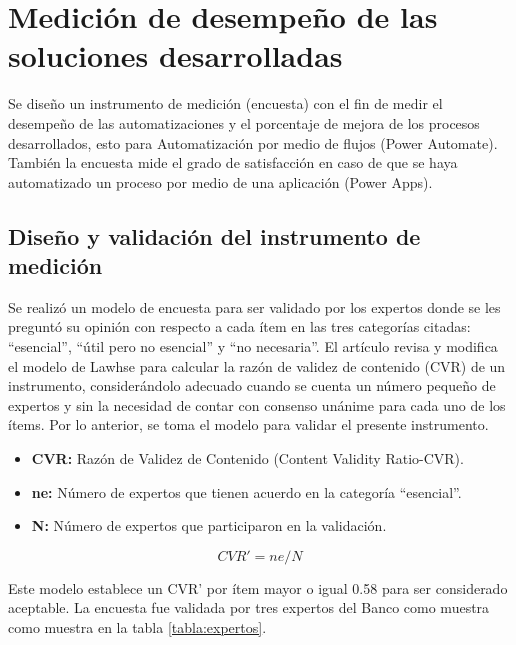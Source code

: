 \chapter{Medición de desempeño de las soluciones desarrolladas}
Se diseño un instrumento de medición (encuesta) con el fin de medir el desempeño de las automatizaciones y el porcentaje de mejora de los procesos desarrollados, esto para Automatización por medio de flujos (Power Automate). También la encuesta mide el grado de satisfacción en caso de que se haya automatizado un proceso
por medio de una aplicación (Power Apps).

\section{Diseño y validación del instrumento de medición}
Se realizó un modelo de encuesta para ser validado por los expertos donde se les preguntó su opinión con respecto a cada ítem en las tres categorías citadas: “esencial”, “útil pero no esencial” y “no necesaria”. 
\newline
El artículo \citep{tristan2008modificacion} revisa y modifica el modelo de Lawhse para calcular la razón de validez de contenido (CVR) de un instrumento, considerándolo adecuado cuando se cuenta un número pequeño de expertos y sin la necesidad de contar con consenso unánime para cada uno de los ítems. Por lo anterior, se toma el modelo \citep{tristan2008modificacion} para validar el presente instrumento. 

\begin{itemize}
	\item \textbf{CVR: }Razón de Validez de Contenido (Content Validity Ratio-CVR).
	\item \textbf{ne: }Número de expertos que tienen acuerdo en la categoría “esencial”.
	\item \textbf{N: }Número de expertos que participaron en la validación.	
\end{itemize}

\begin{equation}\label{Ecuación}
	CVR' = ne/N
\end{equation}


Este modelo establece un CVR’ por ítem mayor o igual 0.58 para ser considerado aceptable. La encuesta fue validada por tres expertos del Banco como muestra como muestra en la tabla \ref{tabla:expertos}.


